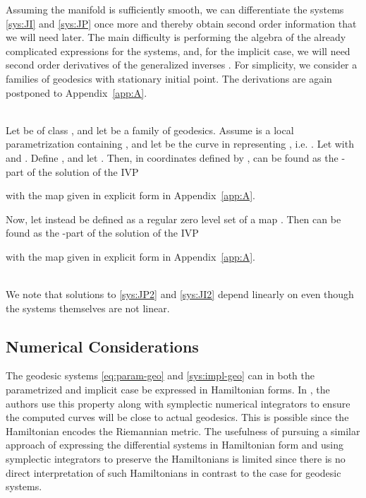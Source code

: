 \documentclass[final]{svjour3}
\begin{document}
Assuming the manifold is sufficiently smooth, we can differentiate the systems 
\eqref{sys:JI} and \eqref{sys:JP} once more and thereby obtain second order
information that we will need later. The main difficulty is
performing the algebra of the already complicated expressions for the systems,
and, for the implicit case, we will need second
order derivatives of the generalized inverses .
For simplicity, we consider a families of geodesics with stationary initial
point. The derivations are
again postponed to Appendix~\ref{app:A}.
\begin{em}
  \vspace{0.5em}
  \\
    Let  be of class , and let  be a family of 
    geodesics. Assume  is a local parametrization
    containing , and let 
    be the curve in  representing , i.e.
    . Let  with 
    and . Define , and let
    .
    Then, in coordinates defined by ,  can be found as the 
    -part of the solution of the IVP
    
    with  the map given in explicit form in Appendix~\ref{app:A}.

    Now, let instead  be defined as a regular zero
    level set of a  map .
    Then  can be found as the -part of the solution of the IVP
    
    with  the map given in explicit form in Appendix~\ref{app:A}.
\end{em}\vspace{0.5em}\\
We note that solutions to \eqref{sys:JP2} and \eqref{sys:JI2} depend linearly on  even
though the systems themselves are not linear.

\subsection{Numerical Considerations}
The geodesic systems \eqref{eq:param-geo} and \eqref{sys:impl-geo} can in both 
the parametrized and implicit case be expressed
in Hamiltonian forms. In \cite{dedieu_symplectic_2005}, the authors use this
property along with symplectic numerical integrators to ensure 
the computed curves will be close to actual geodesics. This is possible since the Hamiltonian encodes
the Riemannian metric. The usefulness of pursuing a similar approach of 
expressing the differential systems in
Hamiltonian form and using symplectic integrators to preserve the Hamiltonians
is limited since there is no
direct interpretation of such Hamiltonians in contrast to the case for 
geodesic systems.
\end{document}
